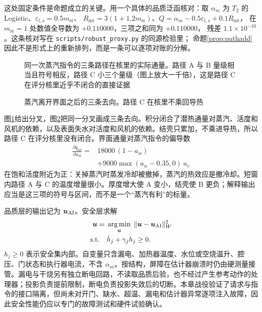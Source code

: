 这处固定条件是命题成立的关键。用一个具体的品质泛函核对：取
\(\alpha_m\) 为 \(T_2\) 的 Logistic、\(\varepsilon_{l,s}=0.5m_{\mathrm{st}}\)、
\(R_{\mathrm{int}}=3(1+1.2m_{\mathrm{st}})\)、\(Q=\alpha_m-0.5\varepsilon_{l,s}+0.1R_{\mathrm{int}}\)，
在 \(m_{\mathrm{st}}=1\) 处数值全导数为 \(+0.110000\)，三项之和同为 \(+0.110000\)，
残差 \(1.1\times10^{-10}\)。这条核对写在 \texttt{scripts/robust\_proxy.py} 的同源检验里；
命题\ref{prop:pathadd} 因此不是形式上的重新排列，而是一条可以逐项对账的分解。

\begin{figure}[htbp]
\centering
{}
\caption{同一次蒸汽指令的三条路径在核里的实际通量。路径 A 与 B 量级相当且符号相反，路径 C 小三个量级（图上放大一千倍），这是路径 C 在评分核里近乎不闭合的直接证据}
\label{fig:path}
\end{figure}

\begin{figure}[htbp]
\centering
{}
\caption{蒸汽离开界面之后的三条去向。路径 C 在核里不乘回导热}
\label{fig:mpaths}
\end{figure}

图\ref{fig:path}{}给出分叉，图\ref{fig:mpaths}{}把同一分叉画成三条去向。积分闭合了潜热通量对蒸汽、活度和风机的依赖，以及表面失水对活度和风机的依赖。结壳只累加，不乘进导热，所以路径 C 在评分核里没有闭合。界面通量对蒸汽指令的偏导数
\begin{equation}
\label{eq:dqlat}
\begin{aligned}
\frac{\partial q_{\mathrm{lat}}}{\partial u_{\mathrm{st}}}
={}&18000\,(1-a_w)\\
&+9000\max(a_w-0.35,0)\,u_v
\end{aligned}
\end{equation}
在饱和活度附近为正：关掉蒸汽时蒸发冷却被撤掉，蒸汽的热效应是撤冷却。短窗内路径 A 与 C 的温度增量很小。厚度增大使 A 变小，结壳使 B 更负；解释输出应当是这三项的符号与区间，而不是一个“蒸汽有利”的标量。

品质层的输出记为 \(\bm{u}_{\mathrm{AI}}\)。安全层求解
\begin{equation}
\label{eq:cbf}
\begin{aligned}
\bm{u}={}&\operatorname*{arg\,min}_{\bm{u}}\;\|\bm{u}-\bm{u}_{\mathrm{AI}}\|_W^2\\
\mathrm{s.t.}\quad
&\dot h_j+\gamma_j h_j\ge 0.
\end{aligned}
\end{equation}
\(h_j\ge 0\) 表示安全集内部\cite{ames2017cbf}。自变量只含漏电、加热器温度、水位或空烧温升、腔压、门状态和执行器电流，不含 \(\alpha_m\)。按结构，屏障在估计器崩溃时仍由硬测量接管。漏电与干烧另有独立断电回路，不读取品质后验，也不经过产生参考动作的处理器；投影负责提前限制，断电负责投影失效后的切断\cite{iec60335,gb4706}。本章战役验证了请求与指令的接口隔离，但尚未对开门、缺水、超温、漏电和估计器异常逐项注入故障，因此安全性能仍应以专门的故障测试和硬件试验确认。

